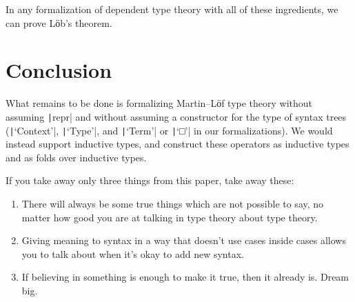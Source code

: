   In any formalization of dependent type theory with all of these
  ingredients, we can prove Lӧb's theorem.

\section{Conclusion} \label{sec:future-work}

  What remains to be done is formalizing Martin--Lӧf type theory
  without assuming \texttt|repr| and without assuming a
  constructor for the type of syntax trees
  (\texttt|‘Context’|, \texttt|‘Type’|, and
  \texttt|‘Term’| or \texttt|‘□’| in our
  formalizations).  We would instead support inductive types, and
  construct these operators as inductive types and as folds over
  inductive types.

  If you take away only three things from this paper, take away these:
  \begin{enumerate}
    \item There will always be some true things which are not possible
      to say, no matter how good you are at talking in type theory
      about type theory.

    \item Giving meaning to syntax in a way that doesn't use cases
      inside cases allows you to talk about when it's okay to add new
      syntax.


    \item If believing in something is enough to make it true, then
      it already is.  Dream big.
  \end{enumerate}

\appendix



%





